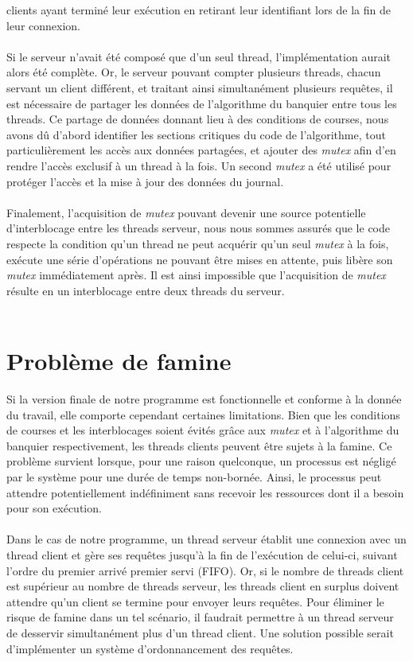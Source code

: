 \documentclass[11pt]{article}
\begin{document}
clients ayant terminé leur exécution en retirant leur identifiant lors de la fin de leur connexion.\\
\\
Si le serveur n’avait été composé que d’un seul thread, l’implémentation aurait alors été complète. Or, le serveur pouvant compter plusieurs 
threads, chacun servant un client différent, et traitant ainsi simultanément plusieurs requêtes, il est nécessaire de partager les données de 
l’algorithme du banquier entre tous les threads. Ce partage de données donnant lieu à des conditions de courses, nous avons dû d’abord 
identifier les sections critiques du code de l’algorithme, tout particulièrement les accès aux données partagées, et ajouter des \emph{mutex} 
afin d’en rendre l’accès exclusif à un thread à la fois. Un second \emph{mutex} a été utilisé pour protéger l’accès et la mise à jour des 
données du journal.\\ 
\\
Finalement, l’acquisition de \emph{mutex} pouvant devenir une source potentielle d’interblocage entre les threads serveur, nous nous sommes 
assurés que le code respecte la condition qu’un thread ne peut acquérir qu’un seul \emph{mutex} à la fois, exécute une série d’opérations ne 
pouvant être mises en attente, puis libère son \emph{mutex} immédiatement après. Il est ainsi impossible que l’acquisition de \emph{mutex} 
résulte en un interblocage entre deux threads du serveur.\\
\\
\section*{ Problème de famine }
\setlength{\parindent}{20pt}
Si la version finale de notre programme est fonctionnelle et conforme à la donnée du travail, elle comporte cependant certaines limitations. 
Bien que les conditions de courses et les interblocages soient évités grâce aux \emph{mutex} et à l’algorithme du banquier respectivement, les 
threads clients peuvent être sujets à la famine. Ce problème survient lorsque, pour une raison quelconque, un processus est négligé par le 
système pour une durée de temps non-bornée. Ainsi, le processus peut attendre potentiellement indéfiniment sans recevoir les ressources dont il 
a besoin pour son exécution.\\ 
\\ 
Dans le cas de notre programme, un thread serveur établit une connexion avec un thread client et gère ses requêtes jusqu’à la fin de l’exécution 
de celui-ci, suivant l’ordre du premier arrivé premier servi (FIFO). Or, si le nombre de threads client est supérieur au nombre de threads 
serveur, les threads client en surplus doivent attendre qu’un client se termine pour envoyer leurs requêtes. Pour éliminer le risque de famine 
dans un tel scénario, il faudrait permettre à un thread serveur de desservir simultanément plus d’un thread client. Une solution possible serait 
d’implémenter un système d’ordonnancement des requêtes.\\ 
\\ 
\end{document}
